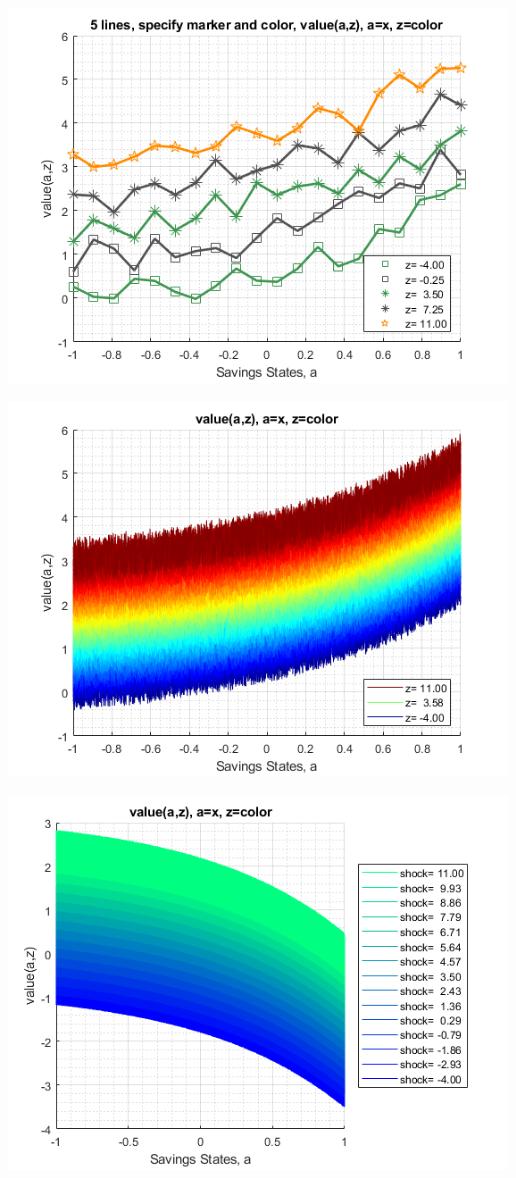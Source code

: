 \documentclass[
]{book}
\begin{document}
\includegraphics[width=5.20833in,height=\textheight]{img/fx_graph_grid_images/figure_5.png}

\includegraphics[width=5.20833in,height=\textheight]{img/fx_graph_grid_images/figure_6.png}

\includegraphics[width=5.20833in,height=\textheight]{img/fx_graph_grid_images/figure_7.png}
\end{document}
